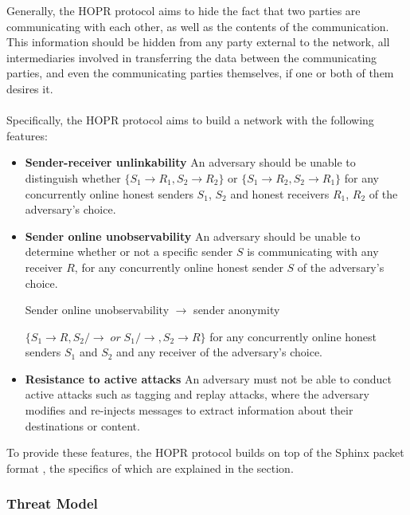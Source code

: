 Generally, the HOPR protocol aims to hide the fact that two parties are communicating with each other, as well as the contents of the communication. This information should be hidden from any party external to the network, all intermediaries involved in transferring the data between the communicating parties, and even the communicating parties themselves, if one or both of them desires it.
\\~\\Specifically, the HOPR protocol aims to build a network with the following features:

\begin{itemize}

    \item \textbf{Sender-receiver unlinkability} An adversary should be unable
        to distinguish whether $\{S_1\rightarrow R_1, S_2\rightarrow R_2\}$ or
        $\{S_1\rightarrow R_2, S_2\rightarrow R_1\}$ for any concurrently online
        honest senders $S_1$, $S_2$ and honest receivers $R_1$, $R_2$ of the
        adversary’s choice.
      \item \textbf{Sender online unobservability} An adversary should be unable to determine whether or not a specific sender $S$ is communicating with any receiver $R$, for any concurrently online honest sender $S$ of the adversary’s choice.
    \begin{center}
    Sender online unobservability $\rightarrow$ sender anonymity 
    \end{center} 
    $\{S_1 \rightarrow R,S_2 /\rightarrow \;or\; S_1 /\rightarrow,S_2 \rightarrow R\}$ for any concurrently online honest senders $S_1$ and $S_2$ and any receiver of the adversary’s choice. 
        

    \item \textbf{Resistance to active attacks} An adversary must not be able to conduct active attacks
        such as tagging and replay attacks, where the adversary modifies and
        re-injects messages to extract information about their destinations or
        content.

\end{itemize}
To provide these features, the HOPR protocol builds on top of the Sphinx packet format \cite{sphinxpaper}, the specifics of which are explained
in the  section.


\subsubsection{Threat Model}

